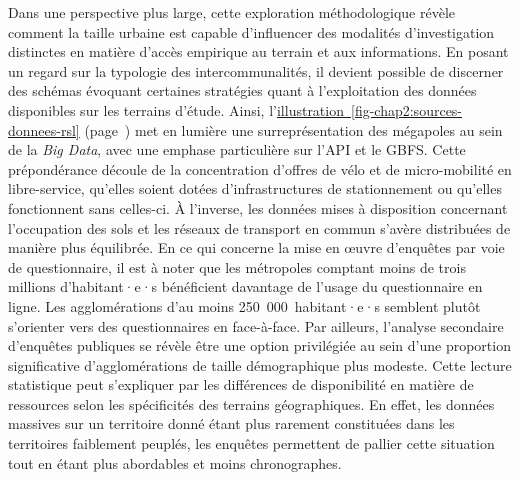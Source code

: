 \begin{refsegment}
Dans une perspective plus large, cette exploration méthodologique révèle comment la taille urbaine est capable d'influencer des modalités d'investigation distinctes en matière d'accès empirique au terrain et aux informations. En posant un regard sur la typologie des intercommunalités, il devient possible de discerner des schémas évoquant certaines stratégies quant à l'exploitation des données disponibles sur les terrains d'étude. Ainsi, l'\hyperref[fig-chap2:sources-donnees-rsl]{illustration~\ref{fig-chap2:sources-donnees-rsl}} (page~\pageref{fig-chap2:sources-donnees-rsl}) met en lumière une surreprésentation des mégapoles au sein de la \textsl{Big Data}, avec une emphase particulière sur l'\acrshort{API} et le \acrshort{GBFS}. Cette prépondérance découle de la concentration d'offres de vélo et de micro-mobilité en libre-service, qu'elles soient dotées d'infrastructures de stationnement ou qu'elles fonctionnent sans celles-ci.  À l'inverse, les données mises à disposition concernant l'occupation des sols et les réseaux de transport en commun s'avère distribuées de manière plus équilibrée. En ce qui concerne la mise en œuvre d'enquêtes par voie de questionnaire, il est à noter que les métropoles comptant moins de trois millions d'habitant·e·s bénéficient davantage de l'usage du questionnaire en ligne. Les agglomérations d'au moins 250~000~habitant·e·s semblent plutôt s'orienter vers des questionnaires en face-à-face. Par ailleurs, l'analyse secondaire d'enquêtes publiques se révèle être une option privilégiée au sein d'une proportion significative d'agglomérations de taille démographique plus modeste. Cette lecture statistique peut s'expliquer par les différences de disponibilité en matière de ressources selon les spécificités des terrains géographiques. En effet, les données massives sur un territoire donné étant plus rarement constituées dans les territoires faiblement peuplés, les enquêtes permettent de pallier cette situation tout en étant plus abordables et moins chronographes.%


\end{refsegment}
